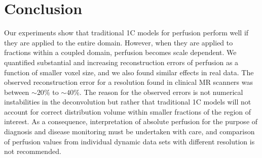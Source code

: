 \documentclass[final,5p,times,twocolumn]{elsarticle}
\begin{document}
	\section{Conclusion}
	Our experiments show that traditional 1C models for perfusion perform well if they are applied to the entire domain.
	However, when they are applied to fractions within a coupled domain, perfusion becomes scale dependent.
	We quantified substantial and increasing reconstruction errors of perfusion as a function of smaller voxel size, and we also found similar effects in real data. The observed reconstruction error for a resolution found in clinical MR scanners was between $\sim$$20\%$ to $\sim$$40\%$. The reason for the observed errors is not numerical instabilities in the deconvolution but rather that traditional 1C models will not account for correct distribution volume within smaller fractions of the region of interest. As a consequence, interpretation of absolute perfusion for the purpose of diagnosis and disease monitoring must be undertaken with care, and comparison of perfusion values from individual dynamic data sets with different resolution is not recommended. 






 





\end{document}
